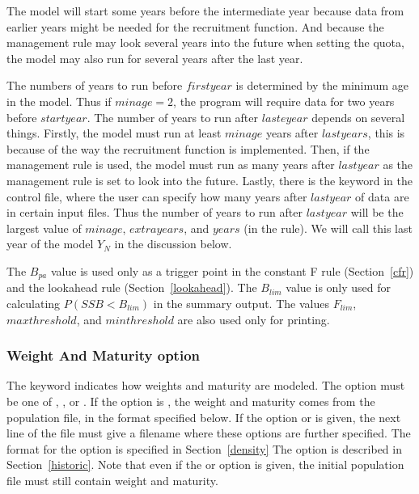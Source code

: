 \documentclass[12pt,twoside,a4paper]{article}
\begin{document}
The model will start some years before the intermediate year because
data from earlier years might be needed for the recruitment
function. And because the management rule may look several years into the
future when setting the quota, the model may also run for several 
years after the
last year. 

The numbers of years to run before $firstyear$ is determined  by the minimum age in
the model. Thus if $minage=2$, the program will require data for two years before
$startyear$. The number of years to run after $lasteyear$ depends on several things.
Firstly, the model must run at least $minage$ years after $lastyears$, this is because of the
way the recruitment function is implemented. Then, if the  management rule is
used, the model must run as many years after $lastyear$ as the  management rule
is set to look into the future. Lastly, there is the keyword  in the control file, 
where the user can specify how many years after $lastyear$ of data are in certain input files.
Thus the number of years to run after $lastyear$ will be the largest value of $minage$, 
$extrayears$, and $years$ (in the  rule). We will call this last year of the
model $Y_N$ in the discussion below.

The $B_{pa}$ value is used only as a trigger point in the constant
F rule (Section~\ref{cfr}) and the lookahead rule (Section~\ref{lookahead}). 
The $B_{lim}$ value is only used for calculating $P(SSB<B_{lim})$ in the summary output. The values $F_{lim}$, 
$maxthreshold$, and $minthreshold$ are also used only for printing.

\subsubsection{Weight And Maturity option}
The keyword  indicates how
weights and maturity are modeled. The option must be one of ,
, or .  If the option is , the weight and
maturity comes from the population file, in the format specified
below. If the option  or  is given, the next line of
the file must give a filename where these options are further
specified. The format for the  option is specified in 
Section~\ref{density}
The  option is described in Section~\ref{historic}. Note that even
if the  or  option is given, the initial population
file must still contain weight and maturity.
\end{document}
